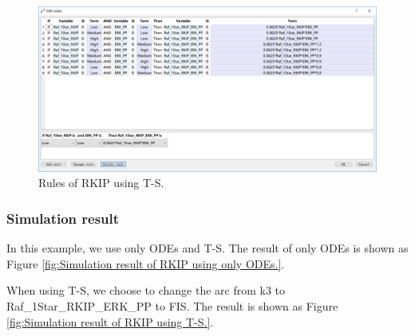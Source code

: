 \documentclass[journal,a4paper,onecolumn]{article}
\begin{document}
\begin{figure}[!hbt]
	\begin{center}
		\includegraphics[width=\columnwidth]{fig46}
		\caption{Rules of RKIP using T-S.}
		\label{fig:Rules of RKIP using T-S.}
	\end{center}
\end{figure}
\subsubsection{Simulation result}
In this example, we use only ODEs and T-S. The result of only ODEs is shown as Figure \ref{fig:Simulation result of RKIP using only ODEs.}.

When using T-S, we choose to change the arc from k3 to Raf\_1Star\_RKIP\_ERK\_PP to FIS. The result is shown as Figure \ref{fig:Simulation result of RKIP using T-S.}.
\end{document}
